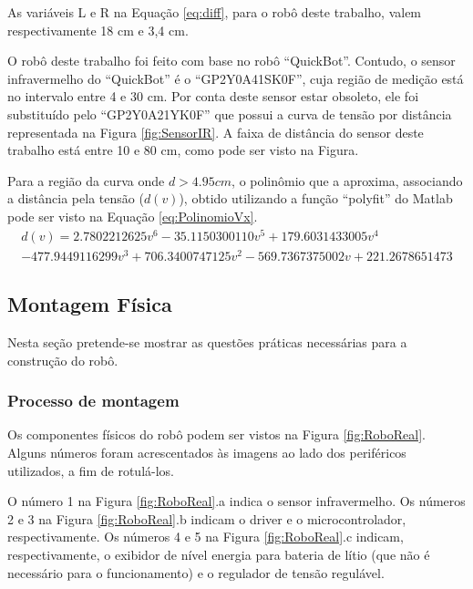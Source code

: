 As variáveis L e R na Equação \ref{eq:diff}, para o robô deste trabalho, valem
respectivamente 18 cm e 3,4 cm.

O robô deste trabalho foi feito com base no robô ``QuickBot''. Contudo, o sensor infravermelho do ``QuickBot''
é o ``GP2Y0A41SK0F'', cuja região de medição está no intervalo entre 4 e 30 cm. Por conta deste sensor estar 
obsoleto, ele foi substituído pelo ``GP2Y0A21YK0F'' que possui a curva de tensão por distância representada na 
Figura \ref{fig:SensorIR}. A faixa de distância do sensor deste trabalho está entre 10 e 80 cm, como pode ser visto
na Figura. 



Para a região da curva onde $d > 4.95 cm$, o polinômio que a aproxima, associando
a distância pela tensão ($d(v)$), obtido utilizando a função ``polyfit'' do Matlab pode ser visto 
na Equação \ref{eq:PolinomioVx}.
\begin{equation}
	\label{eq:PolinomioVx}
	\begin{split}
		d(v) = 2.7802212625 v^6 -35.1150300110 v^5 + 179.6031433005 v^4 \\
		-477.9449116299 v^3 + 706.3400747125 v^2 -569.7367375002 v + 221.2678651473
	\end{split}
\end{equation}

\subsection{Montagem Física}

	Nesta seção pretende-se mostrar as questões práticas necessárias para a construção do 
	robô.
	
\subsubsection{Processo de montagem}

	Os componentes físicos do robô podem ser vistos na Figura \ref{fig:RoboReal}. Alguns
	números foram acrescentados às imagens ao lado dos periféricos utilizados, a fim de 
	rotulá-los.
	
	
	
	O número 1 na Figura \ref{fig:RoboReal}.a indica o sensor infravermelho. Os números 2 e 3
	na Figura \ref{fig:RoboReal}.b indicam o driver e o microcontrolador, respectivamente.
	Os números 4 e 5 na Figura \ref{fig:RoboReal}.c indicam, respectivamente, o exibidor
	de nível energia para bateria de lítio (que não é necessário para o funcionamento) 
	e o regulador de tensão regulável. 
	
